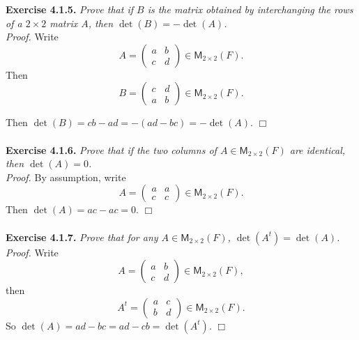 \documentclass{article}
\begin{document}



\textbf{Exercise 4.1.5.}
\emph{Prove that if $B$ is the matrix obtained by interchanging the rows
of a $2 \times 2$ matrix $A$,
then $\det(B) = -\det(A)$.} \\

\emph{Proof.}
Write
$$A =
\begin{pmatrix}
a & b \\
c & d
\end{pmatrix} \in \mathsf{M}_{2 \times 2}(F).$$
Then
$$B =
\begin{pmatrix}
c & d \\
a & b
\end{pmatrix} \in \mathsf{M}_{2 \times 2}(F).$$

Then $\det(B) = cb - ad = -(ad - bc) = -\det(A)$.
$\Box$ \\\\






\textbf{Exercise 4.1.6.}
\emph{Prove that if the two columns of $A \in \mathsf{M}_{2 \times 2}(F)$
are identical, then $\det(A) = 0$.} \\

\emph{Proof.}
By assumption, write
$$A =
\begin{pmatrix}
a & a \\
c & c
\end{pmatrix} \in \mathsf{M}_{2 \times 2}(F).$$
Then $\det(A) = ac - ac = 0$.
$\Box$ \\\\






\textbf{Exercise 4.1.7.}
\emph{Prove that for any $A \in \mathsf{M}_{2 \times 2}(F)$,
$\det(A^t) = \det(A)$.} \\

\emph{Proof.}
Write
$$A =
\begin{pmatrix}
a & b \\
c & d
\end{pmatrix} \in \mathsf{M}_{2 \times 2}(F),$$
then
$$A^t =
\begin{pmatrix}
a & c \\
b & d
\end{pmatrix} \in \mathsf{M}_{2 \times 2}(F).$$
So $\det(A) = ad - bc = ad - cb = \det(A^t)$.
$\Box$ \\\\
\end{document}
